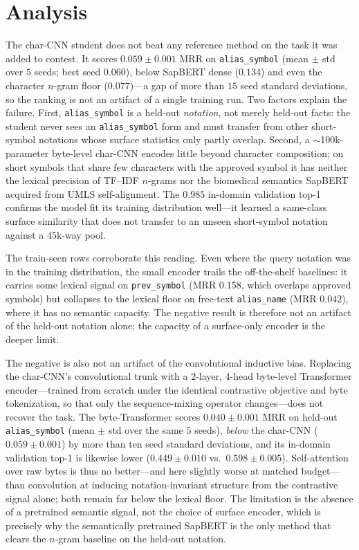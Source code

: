 \documentclass[11pt]{article}
\begin{document}
\section{Analysis}
\label{sec:analysis}
The char-CNN student does not beat any reference method on the task it was added to
contest. It scores $0.059 \pm 0.001$ MRR on \texttt{alias\_symbol} (mean $\pm$ std
over $5$ seeds; best seed $0.060$), below SapBERT dense
($0.134$) and even the character $n$-gram floor ($0.077$)---a gap of more than $15$
seed standard deviations, so the ranking is not an artifact of a single training
run. Two factors explain the
failure. First, \texttt{alias\_symbol} is a held-out \emph{notation}, not merely
held-out facts: the student never sees an \texttt{alias\_symbol} form and must
transfer from other short-symbol notations whose surface statistics only partly
overlap. Second, a $\sim$100k-parameter byte-level char-CNN encodes little beyond
character composition; on short symbols that share few characters with the approved
symbol it has neither the lexical precision of TF--IDF $n$-grams nor the biomedical
semantics SapBERT acquired from UMLS self-alignment. The $0.985$ in-domain
validation top-1 confirms the model fit its training distribution well---it learned
a same-class surface similarity that does not transfer to an unseen short-symbol
notation against a $45$k-way pool.

The train-seen rows corroborate this reading. Even where the query notation was in
the training distribution, the small encoder trails the off-the-shelf baselines:
it carries some lexical signal on \texttt{prev\_symbol} (MRR $0.158$, which overlaps
approved symbols) but collapses to the lexical floor on free-text
\texttt{alias\_name} (MRR $0.042$), where it has no semantic capacity. The negative
result is therefore not an artifact of the held-out notation alone; the capacity of
a surface-only encoder is the deeper limit.

The negative is also not an artifact of the convolutional inductive bias. Replacing
the char-CNN's convolutional trunk with a $2$-layer, $4$-head byte-level
Transformer encoder---trained from scratch under the identical contrastive
objective and byte tokenization, so that only the sequence-mixing operator
changes---does not recover the task. The byte-Transformer scores $0.040 \pm 0.001$
MRR on held-out \texttt{alias\_symbol} (mean $\pm$ std over the same $5$ seeds),
\emph{below} the char-CNN ($0.059 \pm 0.001$) by more than ten seed standard
deviations, and its in-domain validation top-1 is likewise lower ($0.449 \pm 0.010$
vs.\ $0.598 \pm 0.005$). Self-attention over raw bytes is thus no better---and here
slightly worse at matched budget---than convolution at inducing notation-invariant
structure from the contrastive signal alone; both remain far below the lexical
floor. The limitation is the absence of a pretrained semantic signal, not the
choice of surface encoder, which is precisely why the semantically pretrained
SapBERT is the only method that clears the $n$-gram baseline on the held-out
notation.
\end{document}
